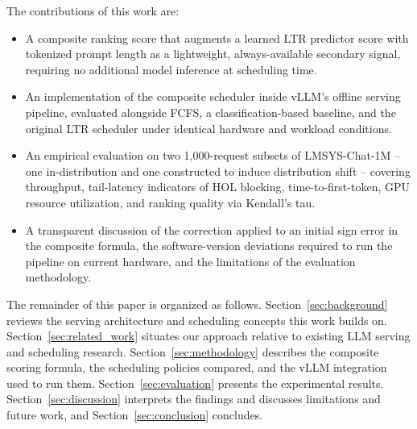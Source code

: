The contributions of this work are:
\begin{itemize}
    \item A composite ranking score that augments a learned LTR predictor
    score with tokenized prompt length as a lightweight, always-available
    secondary signal, requiring no additional model inference at scheduling
    time.
    \item An implementation of the composite scheduler inside vLLM's offline
    serving pipeline, evaluated alongside FCFS, a classification-based
    baseline, and the original LTR scheduler under identical hardware and
    workload conditions.
    \item An empirical evaluation on two 1{,}000-request subsets of
    LMSYS-Chat-1M -- one in-distribution and one constructed to induce
    distribution shift -- covering throughput, tail-latency indicators of HOL
    blocking, time-to-first-token, GPU resource utilization, and ranking
    quality via Kendall's tau.
    \item A transparent discussion of the correction applied to an initial
    sign error in the composite formula, the software-version deviations
    required to run the pipeline on current hardware, and the limitations of
    the evaluation methodology.
\end{itemize}

The remainder of this paper is organized as follows. Section~\ref{sec:background}
reviews the serving architecture and scheduling concepts this work builds on.
Section~\ref{sec:related_work} situates our approach relative to existing LLM
serving and scheduling research. Section~\ref{sec:methodology} describes the
composite scoring formula, the scheduling policies compared, and the vLLM
integration used to run them. Section~\ref{sec:evaluation} presents the
experimental results.
Section~\ref{sec:discussion} interprets the findings and discusses limitations
and future work, and Section~\ref{sec:conclusion} concludes.
